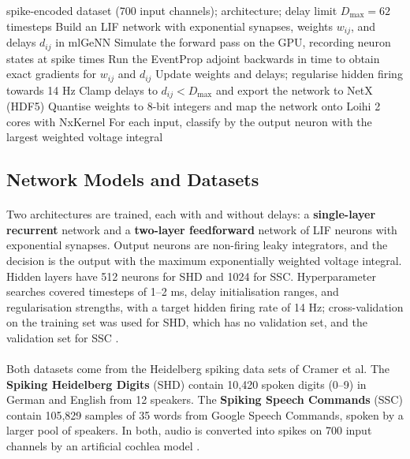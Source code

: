 \documentclass[12pt,a4paper,final]{extreport}
\begin{document}
\begin{algorithm}[htbp]
\caption{Training and deploying delay SNNs on Loihi 2 (summarised from \cite{p1})}\label{alg:p1}
\begin{algorithmic}[1]
\Require spike-encoded dataset (700 input channels); architecture; delay limit $D_{\max}=62$ timesteps
\State Build an LIF network with exponential synapses, weights $w_{ij}$, and delays $d_{ij}$ in mlGeNN
  \State Simulate the forward pass on the GPU, recording neuron states at spike times
  \State Run the EventProp adjoint backwards in time to obtain exact gradients for $w_{ij}$ and $d_{ij}$
  \State Update weights and delays; regularise hidden firing towards 14 Hz
\EndFor
\State Clamp delays to $d_{ij}<D_{\max}$ and export the network to NetX (HDF5)
\State Quantise weights to 8-bit integers and map the network onto Loihi 2 cores with NxKernel
\State For each input, classify by the output neuron with the largest weighted voltage integral
\end{algorithmic}
\end{algorithm}

\subsection{Network Models and Datasets}

\paragraph{} Two architectures are trained, each with and without delays: a \textbf{single-layer recurrent} network and a \textbf{two-layer feedforward} network of LIF neurons with exponential synapses. Output neurons are non-firing leaky integrators, and the decision is the output with the maximum exponentially weighted voltage integral. Hidden layers have 512 neurons for SHD and 1024 for SSC. Hyperparameter searches covered timesteps of 1--2 ms, delay initialisation ranges, and regularisation strengths, with a target hidden firing rate of 14 Hz; cross-validation on the training set was used for SHD, which has no validation set, and the validation set for SSC \cite{p1}.

\paragraph{} Both datasets come from the Heidelberg spiking data sets of Cramer et al. The \textbf{Spiking Heidelberg Digits} (SHD) contain 10{,}420 spoken digits (0--9) in German and English from 12 speakers. The \textbf{Spiking Speech Commands} (SSC) contain 105{,}829 samples of 35 words from Google Speech Commands, spoken by a larger pool of speakers. In both, audio is converted into spikes on 700 input channels by an artificial cochlea model \cite{p1}.
\end{document}
